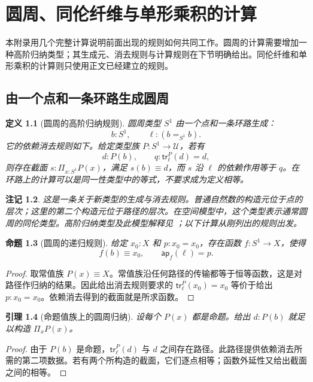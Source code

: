 \documentclass[12pt,oneside,openany,fontset=none]{ctexbook}
\theoremstyle{cn}
\newtheorem{definition}{定义}[chapter]
\newtheorem{lemma}[definition]{引理}
\newtheorem{proposition}[definition]{命题}
\newtheorem{remark}[definition]{注记}
\numberwithin{equation}{chapter}
\newcommand{\U}{\mathcal U}
\newcommand{\ap}{\mathsf{ap}}
\newcommand{\tr}{\mathsf{tr}}
\begin{document}
\appendix

\chapter{圆周、同伦纤维与单形乘积的计算}
\label{chap:calculations}

本附录用几个完整计算说明前面出现的规则如何共同工作。圆周的计算需要增加一种高阶归纳类型；其生成元、消去规则与计算规则在下节明确给出。同伦纤维和单形乘积的计算则只使用正文已经建立的规则。

\section{由一个点和一条环路生成圆周}

\begin{definition}[圆周的高阶归纳规则]
圆周类型 $S^1$ 由一个点和一条环路生成：
\[
 b:S^1,\qquad \ell:(b=_{S^1}b).
\]
它的依赖消去规则如下。给定类型族 $P:S^1\to\U$，若有
\[
 d:P(b),\qquad q:\tr^P_\ell(d)=d,
\]
则存在截面 $s:\Pi_{x:S^1}P(x)$，满足 $s(b)\equiv d$，而 $s$ 沿 $\ell$ 的依赖作用等于 $q$。在环路上的计算可以是同一性类型中的等式，不要求成为定义相等。
\end{definition}

\begin{remark}
这是一条关于新类型的生成与消去规则。普通自然数的构造元位于点的层次；这里的第二个构造元位于路径的层次。在空间模型中，这个类型表示通常圆周的同伦类型。高阶归纳类型及此模型解释见 \cite{HoTT,Rijke}；以下计算从刚列出的规则出发。
\end{remark}

\begin{proposition}[圆周的递归规则]
给定 $x_0:X$ 和 $p:x_0=x_0$，存在函数 $f:S^1\to X$，使得
\[
 f(b)\equiv x_0,\qquad \ap_f(\ell)=p.
\]
\end{proposition}
\begin{proof}
取常值族 $P(x)\equiv X$。常值族沿任何路径的传输都等于恒等函数，这是对路径作归纳的结果。因此给出消去规则要求的 $\tr^P_\ell(x_0)=x_0$ 等价于给出 $p:x_0=x_0$。依赖消去得到的截面就是所求函数。
\end{proof}

\begin{lemma}[命题值族上的圆周归纳]
设每个 $P(x)$ 都是命题。给出 $d:P(b)$ 就足以构造 $\Pi_xP(x)$。
\end{lemma}
\begin{proof}
由于 $P(b)$ 是命题，$\tr^P_\ell(d)$ 与 $d$ 之间存在路径。此路径提供依赖消去所需的第二项数据。若有两个所构造的截面，它们逐点相等；函数外延性又给出截面之间的相等。
\end{proof}
\end{document}
